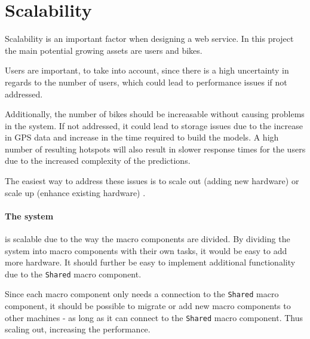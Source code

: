 \section{Scalability}
Scalability is an important factor when designing a web service. In this project the main potential growing assets are users and bikes.

Users are important, to take into account, since there is a high uncertainty in regards to the number of users, which could lead to performance issues if not addressed.

Additionally, the number of bikes should be increasable without causing problems in the system. If not addressed, it could lead to storage issues due to the increase in GPS data and increase in the time required to build the models.
A high number of resulting hotspots will also result in slower response times for the users due to the increased complexity of the predictions.

The easiest way to address these issues is to scale out (adding new hardware) or scale up (enhance existing hardware) \cite{michael2007scale}. 

\paragraph{The system} is scalable due to the way the macro components are divided. By dividing the system into macro components with their own tasks, it would be easy to add more hardware. It should further be easy to implement additional functionality due to the \texttt{Shared} macro component.

Since each macro component only needs a connection to the \texttt{Shared} macro component, it should be possible to migrate or add new macro components to other machines - as long as it can connect to the \texttt{Shared} macro component. Thus scaling out, increasing the performance.
